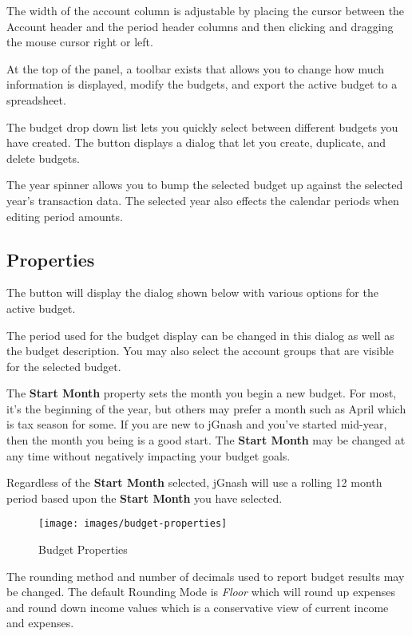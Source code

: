 \documentclass[letterpaper,12pt]{book}
\begin{document}
    The width of the account column is adjustable by placing the cursor between the Account header and the period header
    columns and then clicking and dragging the mouse cursor right or left.

    At the top of the panel, a toolbar exists that allows you to change how much information is displayed, modify the
    budgets, and export the active budget to a spreadsheet.

    The budget drop down list lets you quickly select between different budgets you have created.
    The  button displays a dialog that let you create, duplicate, and delete budgets.

    The year spinner allows you to bump the selected budget up against the selected year's transaction data.
    The selected year also effects the calendar periods when editing period amounts.

    \subsection{Properties}\label{subsec:properties}
    The  button will display the dialog shown below with various options for the active budget.

    The period used for the budget display can be changed in this dialog as well as the budget description.
    You may also select the account groups that are visible for the selected budget.

    The \textbf{Start Month} property sets the month you begin a new budget. For most, it's the beginning of the year, but
    others may prefer a month such as April which is tax season for some. If you are new to jGnash and you've started
    mid-year, then the month you being is a good start. The \textbf{Start Month} may be changed at any time without negatively
    impacting your budget goals.

    Regardless of the \textbf{Start Month} selected, jGnash will use a rolling 12 month period based upon the \textbf{Start Month} you
    have selected.
       
    \begin{figure}[h]
        \caption{Budget Properties}
        \texttt{[image: images/budget-properties]}
    \end{figure}

    The rounding method and number of decimals used to report budget results may be changed.
    The default Rounding Mode is \textit{Floor} which will round up expenses and round down income values which is a conservative
    view of current income and expenses.
\end{document}
